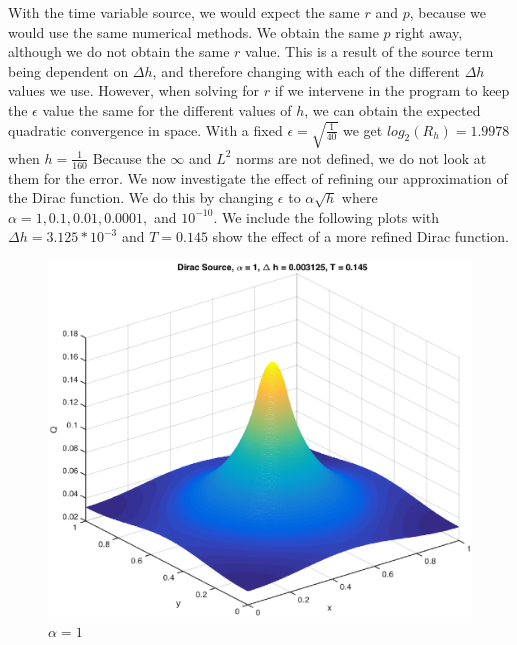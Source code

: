 With the time variable source, we would expect the same $r$ and $p$, because we would use the same numerical methods. We obtain the same $p$ right away, although we do not obtain the same $r$ value. This is a result of the source term being dependent on $\Delta h$, and therefore changing with each of the different $\Delta h$ values we use. However, when solving for $r$ if we intervene in the program to keep the $\epsilon$ value the same for the different values of $h$, we can obtain the expected quadratic convergence in space. With a fixed $\epsilon =  \sqrt{\frac{1}{40}}$ we get $log_2(R_h) = 1.9978$ when $h=\frac{1}{160}$
Because the $\infty$ and $L^2$ norms are not defined, we do not look at them for the error. 
We now investigate the effect of refining our approximation of the Dirac function. We do this by changing $ \epsilon$ to $\alpha \sqrt{h}$ where $\alpha = 1,0.1,0.01,0.0001,$ and $10^{-10}$. 
We include the following plots with $\Delta h = 3.125*10^{-3}$ and $T=0.145$ show the effect of a more refined Dirac function. 
\begin{figure}[!htb]
\centering
\includegraphics[scale=.6]{4_2_a_1.eps}
\caption{$\alpha = 1$}
\label{fig:digraph}
\end{figure}


